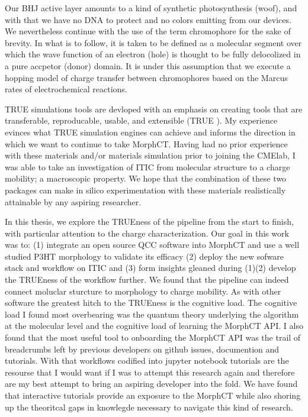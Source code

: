 Our BHJ active layer amounts to a kind of synthetic photosynthesis (woof), and with that we have no DNA to
protect and no colors emitting from our devices. We nevertheless continue with the use of the term chromophore
for the sake of brevity. In what is to follow, it is taken to be defined as a molecular segment over which the 
wave function of an electron (hole) is thought to be fully delocolized in a pure accpetor (donor) domain. 
It is under this assumption that we execute a hopping model of charge transfer between
chromophores based on the Marcus rates of electrochemical reactions.  

TRUE simulations tools are devloped with an emphasis on creating tools that are
transferable, reproducable, usable, and extensible (TRUE \cite{Cummings2017}).
My experience evinces what TRUE simulation engines can achieve and
informs the direction in which we want to continue to take MorphCT. 
Having had no prior experience with these materials and/or materials simulation prior to joining the CMElab,
I was able to take an investigation of ITIC from molecular
structure to a charge mobility; a macroscopic property. We hope that the combination of these two packages
can make in silico experimentation with these materials realistically attainable by any aspiring researcher.
 
In this thesis, we explore the TRUEness of the pipeline from the start to finish, with particular attention
to the charge characterization.
Our goal in this work was to: (1) integrate an open source QCC software into MorphCT and use a 
well studied P3HT morphology to validate its efficacy (2) deploy the new sofware stack and workflow on ITIC
and (3) form insights gleaned during (1)(2) develop the TRUEness of the workflow further. 
We found that the pipeline can indeed connect moluclar sturcture to morphology to charge
mobility. As with other software the greatest hitch to the TRUEness is the
cognitive load. The cognitive load I found most overbearing was the quantum theory underlying the algorithm 
at the molecular level and the cognitive load of learning the MorphCT API. 
I also found that the most useful tool to onboarding the MorphCT API was the
trail of breadcrumbs left by previous developers on github issues, documention and tutorials. 
With that workflows codified into jupyter notebook tutorials are the resourse that I would want if I was to
attempt this research again and therefore are my best attempt to bring an aspiring developer into the fold.
We have found that interactive tutorials provide an exposure to the MorphCT while also shoring up the
theoritcal gaps in knowlegde necessary to navigate this kind of research. 


